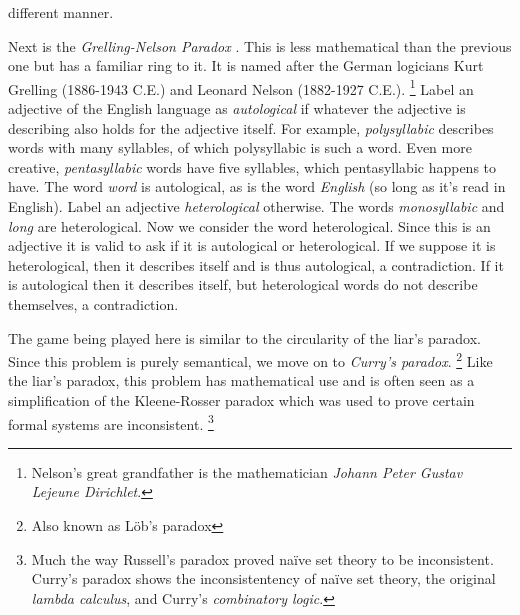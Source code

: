         different manner.
        \par\hfill\par
        Next is the \textit{Grelling-Nelson Paradox}%
        . This is
        less mathematical than the previous one but has a familiar ring to it.
        It is named after the German logicians Kurt
        Grelling (1886-1943 C.E.) and Leonard
        Nelson (1882-1927 C.E.).%
        \footnote{%
            Nelson's great grandfather is the mathematician
            \textit{Johann Peter Gustav Lejeune Dirichlet}.%
        }
        Label an adjective of the English language as \textit{autological} if
        whatever the adjective is describing also holds for the adjective
        itself. For example, \textit{polysyllabic} describes words with many
        syllables, of which polysyllabic is such a word. Even more creative,
        \textit{pentasyllabic} words have five syllables, which pentasyllabic
        happens to have. The word \textit{word} is autological, as is the word
        \textit{English} (so long as it's read in English). Label an adjective
        \textit{heterological} otherwise. The words \textit{monosyllabic} and
        \textit{long} are heterological. Now we consider the word heterological.
        Since this is an adjective it is valid to ask if it is autological or
        heterological. If we suppose it is heterological, then it describes
        itself and is thus autological, a contradiction. If it is autological
        then it describes itself, but heterological words do not describe
        themselves, a contradiction.
        \par\hfill\par
        The game  being played here is similar to the circularity of the
        liar's paradox. Since this problem is purely semantical, we move on to
        \textit{Curry's paradox}.%
        \footnote{%
            Also known as L\"{o}b's paradox%
        }
        Like the liar's paradox, this problem has mathematical use and is often
        seen as a simplification of the Kleene-Rosser paradox%
         which was
        used to prove certain formal systems are inconsistent.%
        \footnote{%
            Much the way Russell's paradox proved na\"{i}ve set theory to
            be inconsistent. Curry's paradox shows the inconsistentency of
            na\"{i}ve set theory, the original \textit{lambda calculus}, and
            Curry's \textit{combinatory logic}.
        }
